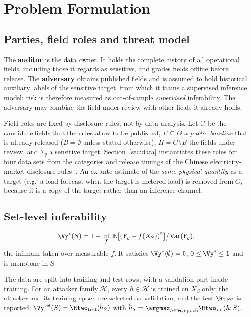 \section{Problem Formulation}\label{sec:problem}

\subsection{Parties, field roles and threat model}
The \textbf{auditor} is the data owner. It holds the complete history of all operational
fields, including those it regards as sensitive, and grades fields offline before release.
The \textbf{adversary} obtains published fields and is assumed to hold historical auxiliary
labels of the sensitive target, from which it trains a supervised inference model; risk is
therefore measured as out-of-sample \emph{supervised} inferability. The adversary may combine
the field under review with other fields it already holds.

Field roles are fixed by disclosure rules, not by data analysis. Let $G$ be the candidate
fields that the rules allow to be published, $B\subseteq G$ a \emph{public baseline} that is
already released ($B=\emptyset$ unless stated otherwise), $H=G\setminus B$ the fields under
review, and $Y_y$ a sensitive target. Section~\ref{sec:data} instantiates these roles for
four data sets from the categories and release timings of the Chinese electricity-market
disclosure rules~\cite{nea2024disclosure}. An ex-ante estimate of the \emph{same physical
quantity} as a target (e.g.\ a load forecast when the target is metered load) is removed from
$G$, because it is a copy of the target rather than an inference channel.

\subsection{Set-level inferability}
\begin{definition}
\[
\Vy^{*}(S) = 1 - \inf_{f}\,\mathbb{E}\big[(Y_y - f(X_S))^{2}\big] \big/ \mathrm{Var}(Y_y),
\]
the infimum taken over measurable $f$. It satisfies $\Vy^{*}(\emptyset)=0$, $0 \le \Vy^{*} \le 1$
and is monotone in $S$.
\end{definition}

\begin{definition}\label{def:vret}
The data are split into training and test rows, with a validation part inside training. For
an attacker family $\mathcal{H}$, every $h\in\mathcal{H}$ is trained on $X_S$ only; the
attacker and its training epoch are selected on validation, and the test $\Rtwo$ is reported:
$\Vy^{\mathrm{ret}}(S) = \Rtwo_{\mathrm{test}}(\hat h_S)$ with
$\hat h_S = \argmax_{h \in \mathcal{H},\,\mathrm{epoch}} \Rtwo_{\mathrm{val}}(h;S)$.
\end{definition}

